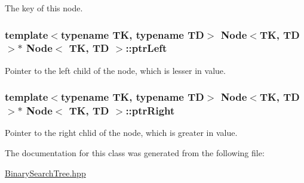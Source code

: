 The key of this node. 

\subsubsection[{\texorpdfstring{ptr\+Left}{ptrLeft}}]{\setlength{\rightskip}{0pt plus 5cm}template$<$typename TK, typename TD$>$ {\bf Node}$<$TK, TD$>$$\ast$ {\bf Node}$<$ TK, TD $>$\+::ptr\+Left}\hypertarget{classNode_a98e0618e17b682e76c861f747a40c960}{}\label{classNode_a98e0618e17b682e76c861f747a40c960}


Pointer to the left child of the node, which is lesser in value. 

\subsubsection[{\texorpdfstring{ptr\+Right}{ptrRight}}]{\setlength{\rightskip}{0pt plus 5cm}template$<$typename TK, typename TD$>$ {\bf Node}$<$TK, TD$>$$\ast$ {\bf Node}$<$ TK, TD $>$\+::ptr\+Right}\hypertarget{classNode_a593bc4a915d083d34a92783f53c573e8}{}\label{classNode_a593bc4a915d083d34a92783f53c573e8}


Pointer to the right chlid of the node, which is greater in value. 



The documentation for this class was generated from the following file\+:\begin{DoxyCompactItemize}
\item 
\hyperlink{BinarySearchTree_8hpp}{Binary\+Search\+Tree.\+hpp}\end{DoxyCompactItemize}
